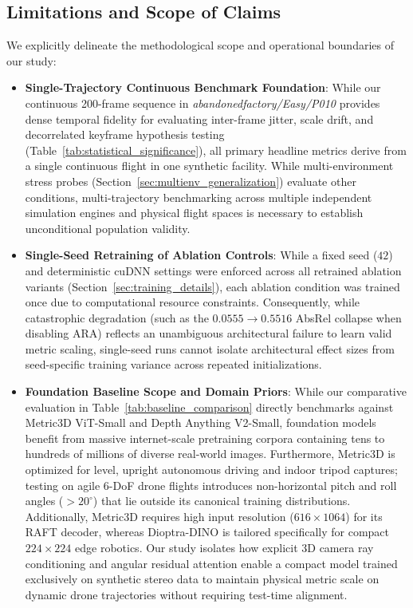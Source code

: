 \subsection{Limitations and Scope of Claims}
We explicitly delineate the methodological scope and operational boundaries of our study:
\begin{itemize}
    \item \textbf{Single-Trajectory Continuous Benchmark Foundation}: While our continuous 200-frame sequence in \textit{abandonedfactory/Easy/P010} provides dense temporal fidelity for evaluating inter-frame jitter, scale drift, and decorrelated keyframe hypothesis testing (Table~\ref{tab:statistical_significance}), all primary headline metrics derive from a single continuous flight in one synthetic facility. While multi-environment stress probes (Section~\ref{sec:multienv_generalization}) evaluate other conditions, multi-trajectory benchmarking across multiple independent simulation engines and physical flight spaces is necessary to establish unconditional population validity.
    \item \textbf{Single-Seed Retraining of Ablation Controls}: While a fixed seed ($42$) and deterministic cuDNN settings were enforced across all retrained ablation variants (Section~\ref{sec:training_details}), each ablation condition was trained once due to computational resource constraints. Consequently, while catastrophic degradation (such as the $0.0555 \to 0.5516$ AbsRel collapse when disabling ARA) reflects an unambiguous architectural failure to learn valid metric scaling, single-seed runs cannot isolate architectural effect sizes from seed-specific training variance across repeated initializations.
    \item \textbf{Foundation Baseline Scope and Domain Priors}: While our comparative evaluation in Table~\ref{tab:baseline_comparison} directly benchmarks against Metric3D ViT-Small and Depth Anything V2-Small, foundation models benefit from massive internet-scale pretraining corpora containing tens to hundreds of millions of diverse real-world images. Furthermore, Metric3D is optimized for level, upright autonomous driving and indoor tripod captures; testing on agile 6-DoF drone flights introduces non-horizontal pitch and roll angles ($>20^\circ$) that lie outside its canonical training distributions. Additionally, Metric3D requires high input resolution ($616 \times 1064$) for its RAFT decoder, whereas Dioptra-DINO is tailored specifically for compact $224 \times 224$ edge robotics. Our study isolates how explicit 3D camera ray conditioning and angular residual attention enable a compact model trained exclusively on synthetic stereo data to maintain physical metric scale on dynamic drone trajectories without requiring test-time alignment.

\end{itemize}
